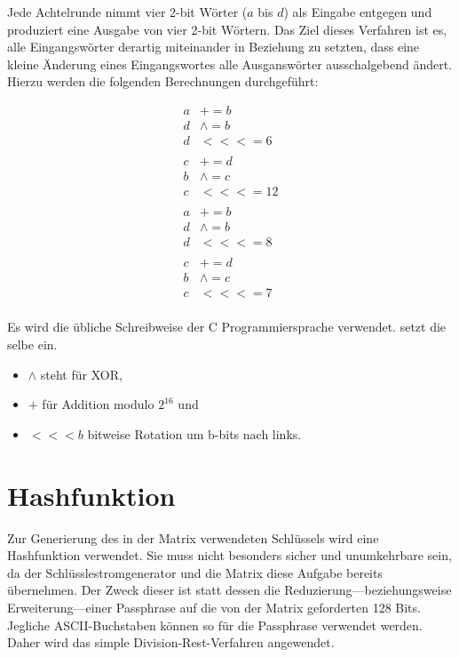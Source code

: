 \documentclass[10pt,a4paper]{article}
\begin{document}
Jede Achtelrunde nimmt vier 2-bit Wörter ($a$ bis $d$) als Eingabe entgegen und produziert eine Ausgabe von vier 2-bit Wörtern.
Das Ziel dieses Verfahren ist es, alle Eingangswörter derartig miteinander in Beziehung zu setzten, dass eine kleine Änderung eines Eingangswortes alle Ausganswörter ausschalgebend ändert.
Hierzu werden die folgenden Berechnungen durchgeführt:

\begin{align*}
    a & +=       b  \\
    d & \wedge = b  \\
    d & <<<=     6  \\
      &             \\
    c & +=       d  \\
    b & \wedge = c  \\
    c & <<<=     12 \\
      &             \\
    a & +=       b  \\
    d & \wedge = b  \\
    d & <<<=     8  \\
      &             \\
    c & +=       d  \\
    b & \wedge = c  \\
    c & <<<=     7  \\
\end{align*}

Es wird die übliche Schreibweise der C Programmiersprache verwendet.
\cite{Bernstein2008} setzt die selbe ein.
\begin{itemize}
    \item $\wedge$ steht für XOR,
    \item $+$ für Addition modulo $2^{16}$ und
    \item $<<<b$ bitweise Rotation um b-bits nach links.
\end{itemize}

\section{Hashfunktion}

Zur Generierung des in der Matrix verwendeten Schlüssels wird eine Hashfunktion verwendet.
Sie muss nicht besonders sicher und unumkehrbare sein, da der Schlüsslestromgenerator und die Matrix diese Aufgabe bereits übernehmen.
Der Zweck dieser ist statt dessen die Reduzierung---beziehungsweise Erweiterung---einer Passphrase auf die von der Matrix geforderten 128 Bits.
Jegliche ASCII-Buchstaben können so für die Passphrase verwendet werden.
Daher wird das simple Division-Rest-Verfahren\cite{Silies2021} angewendet.
\end{document}

